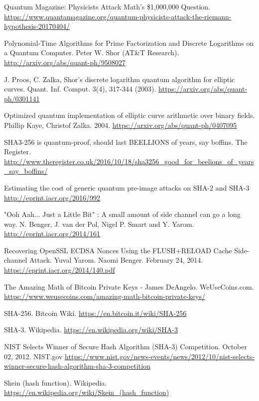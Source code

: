 \documentclass[11pt]{article}
\begin{document}
\begin{thebibliography}{7}
Quantum Magazine: Physicists Attack Math's \$1,000,000 Question.
\url{https://www.quantamagazine.org/quantum-physicists-attack-the-riemann-hypothesis-20170404/}

Polynomial-Time Algorithms for Prime Factorization and Discrete Logarithms on a Quantum Computer. Peter W. Shor (AT\&T Research).
\url{http://arxiv.org/abs/quant-ph/9508027}

J. Proos, C. Zalka, Shor's discrete logarithm quantum algorithm for elliptic curves. Quant. Inf. Comput. 3(4), 317-344 (2003).
\url{https://arxiv.org/abs/quant-ph/0301141}

Optimized quantum implementation of elliptic curve arithmetic over binary fields. Phillip Kaye, Christof Zalka. 2004.
\url{https://arxiv.org/abs/quant-ph/0407095}

SHA3-256 is quantum-proof, should last BEELLIONS of years, say boffins. The Register.
\url{http://www.theregister.co.uk/2016/10/18/sha3256_good_for_beelions_of_years_say_boffins/}

Estimating the cost of generic quantum pre-image attacks on SHA-2 and SHA-3
\url{http://eprint.iacr.org/2016/992}

"Ooh Aah... Just a Little Bit" : A small amount of side channel can go a long way. N. Benger, J. van der Pol, Nigel P. Smart and Y. Yarom.
\url{http://eprint.iacr.org/2014/161}

Recovering OpenSSL ECDSA Nonces Using the FLUSH+RELOAD Cache Side-channel Attack. Yuval Yarom. Naomi Benger. February 24, 2014.
\url{https://eprint.iacr.org/2014/140.pdf}

The Amazing Math of Bitcoin Private Keys - James DeAngelo. WeUseCoins.com.
\url{https://www.weusecoins.com/amazing-math-bitcoin-private-keys/}

SHA-256. Bitcoin Wiki.
\url{https://en.bitcoin.it/wiki/SHA-256}

SHA-3. Wikipedia.
\url{https://en.wikipedia.org/wiki/SHA-3}

NIST Selects Winner of Secure Hash Algorithm (SHA-3) Competition. October 02, 2012. NIST.gov
\url{https://www.nist.gov/news-events/news/2012/10/nist-selects-winner-secure-hash-algorithm-sha-3-competition}

Skein (hash function). Wikipedia.
\url{https://en.wikipedia.org/wiki/Skein_(hash_function)}


\end{thebibliography}
\end{document}
